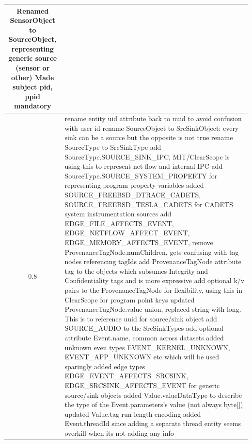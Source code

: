 \documentclass[10pt, conference, onecolumn]{IEEEtran}
\begin{document}
\begin{longtable}{|c|p{17cm}|}
  Renamed SensorObject to SourceObject, representing generic source (sensor or other)  \newline
  Made subject pid, ppid mandatory 
\\\hline
0.8 & \small
 rename entity uid attribute back to uuid to avoid confusion with user id \newline
 rename SourceObject to SrcSinkObject: every sink can be a source but the opposite is not true \newline
 rename SourceType to SrcSinkType \newline
 add SourceType.SOURCE\_SINK\_IPC, MIT/ClearScope is using this to represent net flow and internal IPC \newline
 add SourceType.SOURCE\_SYSTEM\_PROPERTY for representing program property variables \newline
 added SOURCE\_FREEBSD\_DTRACE\_CADETS, SOURCE\_FREEBSD\_TESLA\_CADETS for CADETS system instrumentation sources \newline
 add EDGE\_FILE\_AFFECTS\_EVENT, EDGE\_NETFLOW\_AFFECT\_EVENT, EDGE\_MEMORY\_AFFECTS\_EVENT, \newline
 remove ProvenanceTagNode.numChildren, gets confusing with tag nodes referencing tagIds \newline
 add ProvenanceTagNode attribute tag to the objects which subsumes Integrity and Confidentiality tags and is more expressive \newline 
 add optional k/v pairs to the ProvenanceTagNode for flexibility, using this in ClearScope for program point keys \newline
 updated ProvenanceTagNode.value union, replaced string with long. This is to reference uuid for source/sink object \newline
 add SOURCE\_AUDIO to the SrcSinkTypes \newline
 add optional attribute Event.name, common across datasets \newline
 added unknown even types EVENT\_KERNEL\_UNKNOWN, EVENT\_APP\_UNKNOWN etc which will be used sparingly \newline
 added edge types EDGE\_EVENT\_AFFECTS\_SRCSINK, EDGE\_SRCSINK\_AFFECTS\_EVENT for generic source/sink objects \newline
 added Value.valueDataType to describe the type of the Event.parameters's value (not always byte[]) \newline 
 updated Value.tag run length encoding \newline
 added Event.threadId since adding a separate thread entity seems overkill when its not adding any info  

\end{longtable}
\end{document}
